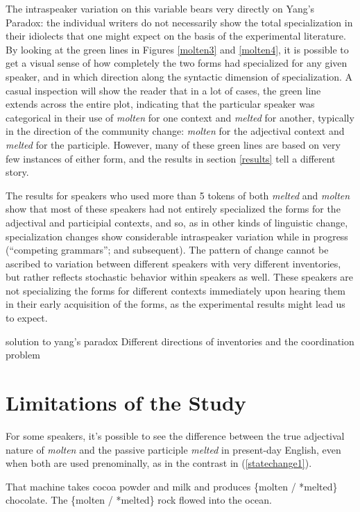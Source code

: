 \documentclass{artikel3}
\begin{document}
The intraspeaker variation on this variable bears very directly on Yang's Paradox: the individual writers do not necessarily show the total specialization in their idiolects that one might expect on the basis of the experimental literature. By looking at the green lines in Figures \ref{molten3} and \ref{molten4}, it is possible to get a visual sense of how completely the two forms had specialized for any given speaker, and in which direction along the syntactic dimension of specialization. A casual inspection will show the reader that in a lot of cases, the green line extends across the entire plot, indicating that the particular speaker was categorical in their use of \textsl{molten} for one context and \textsl{melted} for another, typically in the direction of the community change: \textsl{molten} for the  adjectival context and \textsl{melted} for the participle. However, many of these green lines are based on very few instances of either form, and the results in section \ref{results} tell a different story. 

The results for speakers who used more than 5 tokens of both \textsl{melted} and \textsl{molten} show that most of these speakers had not entirely specialized the forms for the adjectival and participial contexts, and so, as in other kinds of linguistic change, specialization changes show considerable intraspeaker variation while in progress (``competing grammars''; \citealt{kroch1989} and subsequent). The pattern of change cannot be ascribed to variation between different speakers with very different inventories, but rather reflects stochastic behavior within speakers as well. These speakers are not specializing the forms for different contexts immediately upon hearing them in their early acquisition of the forms, as the experimental results might lead us to expect.

solution to yang's paradox Different directions of inventories and the coordination problem 


\section{Limitations of the Study}
\label{limitations}


For some speakers, it's possible to see the difference between the true adjectival nature of \textsl{molten} and the passive participle \textsl{melted} in present-day English, even when both are used prenominally, as in the contrast in (\ref{statechange1}). 

\begin{exe}
	\ex \label{statechange1} That machine takes cocoa powder and milk and produces \{molten / *melted\} chocolate.
	\ex \label{statechange2} The \{molten / *melted\} rock flowed into the ocean.
\end{exe}
\end{document}
